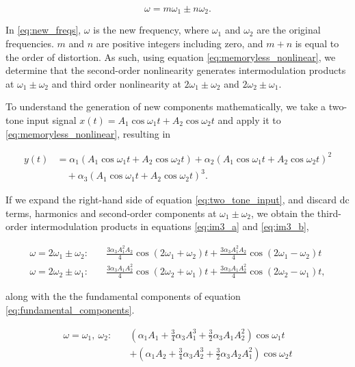 \begin{equation}
  \omega = m\omega_1 \pm n\omega_2.
  \label{eq:new_freqs}
\end{equation}

In \eqref{eq:new_freqs}, $\omega$ is the new frequency, where $\omega_1$ and $\omega_2$ are the original frequencies. $m$ and $n$ are positive integers including zero, and $m + n$ is equal to the order of distortion. As such, using equation \eqref{eq:memoryless_nonlinear}, we determine that the second-order nonlinearity generates intermodulation products at $\omega_1 \pm \omega_2$ and third order nonlinearity at $2\omega_1 \pm \omega_2$ and $2\omega_2 \pm \omega_1$.

To understand the generation of new components mathematically, we take a two-tone input signal $x(t) = A_1\cos \omega_1 t + A_2\cos \omega_2 t$ and apply it to \eqref{eq:memoryless_nonlinear}, resulting in

\begin{equation}
\begin{split}
  y(t) &= \alpha_1(A_1\cos\omega_1 t + A_2\cos\omega_2 t)
          + \alpha_2(A_1\cos\omega_1 t + A_2\cos\omega_2 t)^2 \\
       &\quad + \alpha_3(A_1\cos\omega_1 t + A_2\cos\omega_2 t)^3 .
\end{split}
\label{eq:two_tone_input}
\end{equation}

If we expand the right-hand side of equation \eqref{eq:two_tone_input}, and discard dc terms, harmonics and second-order components at $\omega_1 \pm \omega_2$, we obtain the third-order intermodulation products in equations \eqref{eq:im3_a} and \eqref{eq:im3_b},

\begin{align}
  \omega = 2\omega_1 \pm \omega_2 :\quad
    &\frac{3\alpha_3 A_1^2 A_2}{4}\cos(2\omega_1+\omega_2)t
     + \frac{3\alpha_3 A_1^2 A_2}{4}\cos(2\omega_1-\omega_2)t
     \label{eq:im3_a} \\
  \omega = 2\omega_2 \pm \omega_1 :\quad
    &\frac{3\alpha_3 A_1 A_2^2}{4}\cos(2\omega_2+\omega_1)t
     + \frac{3\alpha_3 A_1 A_2^2}{4}\cos(2\omega_2-\omega_1)t
     \label{eq:im3_b},
\end{align}

along with the the fundamental components of equation \eqref{eq:fundamental_components}.

\begin{align}
  \omega = \omega_1,\ \omega_2 :\quad
    &\left(\alpha_1 A_1 + \frac{3}{4}\alpha_3 A_1^3
           + \frac{3}{2}\alpha_3 A_1 A_2^2\right)\cos\omega_1 t \nonumber \\
    &+ \left(\alpha_1 A_2 + \frac{3}{4}\alpha_3 A_2^3
           + \frac{3}{2}\alpha_3 A_2 A_1^2\right)\cos\omega_2 t
     \label{eq:fundamental_components}
\end{align}

